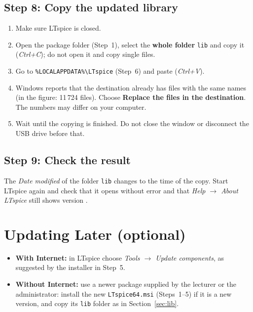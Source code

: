\subsection{Step 8: Copy the updated library}
\begin{enumerate}[itemsep=2pt]
  \item Make sure LTspice is closed.
  \item Open the package folder (Step~1), select the \textbf{whole folder} \texttt{lib} and copy it (\textit{Ctrl+C}); do not open it and copy single files.
  \item Go to \texttt{\%LOCALAPPDATA\%\textbackslash LTspice} (Step~6) and paste (\textit{Ctrl+V}).
  \item Windows reports that the destination already has files with the same names (in the figure:
        11\,724 files). Choose \textbf{Replace the files in the destination}. The numbers may differ on your computer.
  \item Wait until the copying is finished. Do not close the window or disconnect the USB drive before that.
\end{enumerate}

\subsection{Step 9: Check the result}
The \textit{Date modified} of the folder \texttt{lib} changes to the time of the copy. Start LTspice again
and check that it opens without error and that \textit{Help $\rightarrow$ About LTspice} still shows version \ltspiceVersion.

\section{Updating Later (optional)}\label{sec:update}
\begin{itemize}[itemsep=2pt]
  \item \textbf{With Internet:} in LTspice choose \textit{Tools $\rightarrow$ Update components}, as suggested by the installer in Step~5.
  \item \textbf{Without Internet:} use a newer package supplied by the lecturer or the administrator: install the new \texttt{LTspice64.msi} (Steps~1--5) if it is a new version, and copy its \texttt{lib} folder as in Section~\ref{sec:lib}.
\end{itemize}

